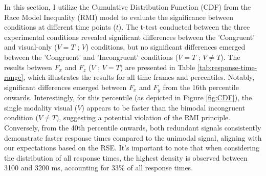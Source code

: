 \documentclass[12pt,oneside,openright]{report}
\begin{document}
In this section, I utilize the Cumulative Distribution Function (CDF) from the Race Model Inequality (RMI) model to evaluate the significance between conditions at different time points ($t$). The t-test conducted between the three experimental conditions revealed significant differences between the 'Congruent' and visual-only ($V=T$ ; $V$) conditions, but no significant differences emerged between the 'Congruent' and 'Incongruent' conditions ($V=T$ ; $V \neq T$). The results between $F_x$ and $F_z$ ($V$ ; $V=T$) are presented in Table \ref{tab:response-time-range}, which illustrates the results for all time frames and percentiles. Notably, significant differences emerged between $F_x$ and $F_y$ from the 16th percentile onwards. Interestingly, for this percentile (as depicted in Figure \ref{fig:CDF}), the single modality visual ($V$) appears to be faster than the bimodal incongruent condition ($V \neq T$), suggesting a potential violation of the RMI principle. Conversely, from the 40th percentile onwards, both redundant signals consistently demonstrate faster response times compared to the unimodal signal, aligning with our expectations based on the RSE. It's important to note that when considering the distribution of all response times, the highest density is observed between 3100 and 3200 ms, accounting for 33\% of all response times.
\end{document}
